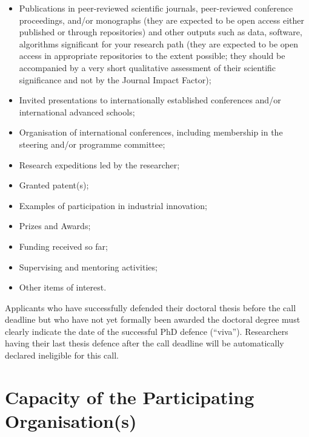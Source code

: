 \documentclass[11pt,draftproposal]{msca-pf-2022}
\begin{document}
\begin{itemize}
    \item Publications in peer-reviewed scientific journals, peer-reviewed conference
    proceedings,  and/or monographs (they are expected to be open access either
    published or through repositories) and other outputs such as data, software,
    algorithms significant for your research path (they are expected to be open
    access in appropriate repositories to the extent possible; they should be
    accompanied by a very short qualitative assessment of their scientific
    significance and not by the Journal Impact Factor);

    \item Invited presentations to internationally established conferences and/or
    international advanced schools;

    \item Organisation of international conferences, including membership in
    the steering and/or programme committee;

    \item Research expeditions led by the researcher;

    \item Granted patent(s);

    \item Examples of participation in industrial innovation;

    \item Prizes and Awards;

    \item Funding received so far;

    \item Supervising and mentoring activities;

    \item Other items of interest.
\end{itemize}

Applicants who have successfully defended their doctoral thesis before the call
deadline but who have not yet formally been awarded the doctoral degree must
clearly indicate the date of the successful PhD defence (``viva''). Researchers
having their last thesis defence after the call deadline will be automatically
declared ineligible for this call.

\section{Capacity of the Participating Organisation(s)}
\end{document}
